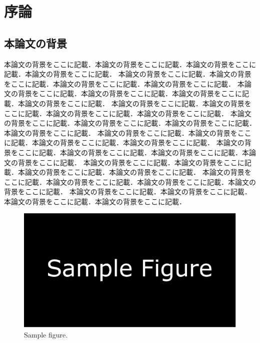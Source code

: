 \chapter{序論}
\label{chap:intro}

\section{本論文の背景}
本論文の背景をここに記載．本論文の背景をここに記載．本論文の背景をここに記載．本論文の背景をここに記載．
本論文の背景をここに記載．本論文の背景をここに記載．本論文の背景をここに記載．本論文の背景をここに記載．
本論文の背景をここに記載．本論文の背景をここに記載．本論文の背景をここに記載．本論文の背景をここに記載．
本論文の背景をここに記載．本論文の背景をここに記載．本論文の背景をここに記載．本論文の背景をここに記載．
本論文の背景をここに記載．本論文の背景をここに記載．本論文の背景をここに記載．本論文の背景をここに記載．
本論文の背景をここに記載．本論文の背景をここに記載．本論文の背景をここに記載．本論文の背景をここに記載．
本論文の背景をここに記載．本論文の背景をここに記載．本論文の背景をここに記載．本論文の背景をここに記載．
本論文の背景をここに記載．本論文の背景をここに記載．本論文の背景をここに記載．本論文の背景をここに記載．
本論文の背景をここに記載．本論文の背景をここに記載．本論文の背景をここに記載．本論文の背景をここに記載．
本論文の背景をここに記載．本論文の背景をここに記載．本論文の背景をここに記載．本論文の背景をここに記載．

\begin{figure}[!t]
\centering
\includegraphics[width=0.95\hsize]{ch_intro/sample.pdf}
\caption{Sample figure.}
\label{fig:intro:sample}
\end{figure}

